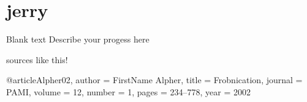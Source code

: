 \section{jerry}
\label{sec:jerry}


Blank text
Describe your progess here


sources like this!

@article{Alpher02,
author = {FirstName Alpher},
title = {Frobnication},
journal = PAMI,
volume = 12,
number = 1,
pages = {234--778},
year = 2002
}



